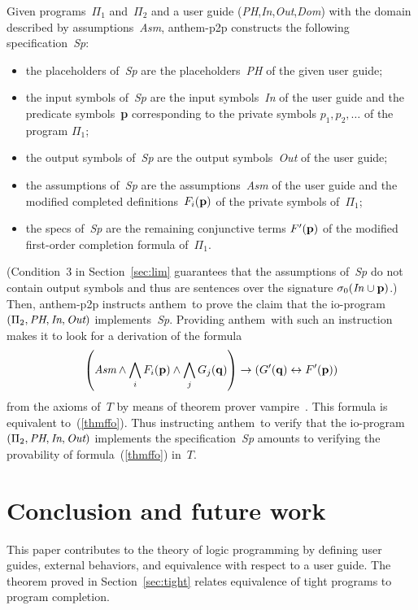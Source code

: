 \documentclass{tlp}
\def\lrar{\leftrightarrow}
\def\anthem{{\sc anthem}}
\def\vampire{{\sc vampire}}
\begin{document}
Given programs~$\Pi_1$ and~$\Pi_2$ and a user guide
(\emph{PH},\emph{In},\emph{Out},\emph{Dom\/}) with the domain described
by assumptions~\emph{Asm}, {\sc anthem-p2p} constructs the following
specification~\emph{Sp\/}:
\begin{itemize}
\item
  the placeholders of~\emph{Sp\/} are the placeholders~\emph{PH\/} of the
  given user guide;
  \item
    the input symbols of~\emph{Sp\/} are the input symbols~\emph{In} of
    the user guide and the predicate symbols~{\bf p} corresponding to
    the private symbols $p_1,p_2,\dots$ of the program $\Pi_1$;
  \item
    the output symbols of~\emph{Sp\/} are the output symbols~\emph{Out} of
the user guide;
\item
  the assumptions of~\emph{Sp\/} are the assumptions~\emph{Asm} of the
  user guide and the modified completed definitions~$F_i({\bf p})$ of the
  private symbols of~$\Pi_1$;
\item
  the specs of~\emph{Sp\/} are the remaining conjunctive terms
  $F'({\bf p})$ of the modified first-order completion formula of~$\Pi_1$.
\end{itemize}
(Condition~3 in Section~\ref{sec:lim} guarantees that
the assumptions of~\emph{Sp\/} do not contain output symbols and thus
are sentences over the signature $\sigma_0(\emph{In\/}\cup{\bf p})$.)
Then, {\sc anthem-p2p} 
instructs \anthem\ to prove the claim
that the io-program $(\Pi_2,\emph{PH},\emph{In},\emph{Out})$
implements~\emph{Sp\/}.
Providing \anthem\ with such an instruction makes it to look for a derivation of the formula
$$\left(
    \emph{Asm}\land\bigwedge_i F_i({\bf p})
\land\bigwedge_j G_j({\bf q}) \right) \to (G'({\bf q})\lrar F'({\bf p}))
$$
from the axioms of~$T$ by means of theorem prover \vampire~\cite[Section~6.4]{fan20}.
This formula is equivalent to~(\ref{thmffo}).
Thus instructing \anthem\ to verify that
the io-program $(\Pi_2,\emph{PH},\emph{In},\emph{Out})$
implements the specification~\emph{Sp\/} amounts to verifying the provability
of formula~(\ref{thmffo}) in~$T$. 
\section{Conclusion and future work}

This paper contributes to the theory of logic programming by defining user
guides, external behaviors, and equivalence with respect to a user guide.
The theorem proved in Section~\ref{sec:tight} relates equivalence of tight
programs to program completion.
\end{document}
